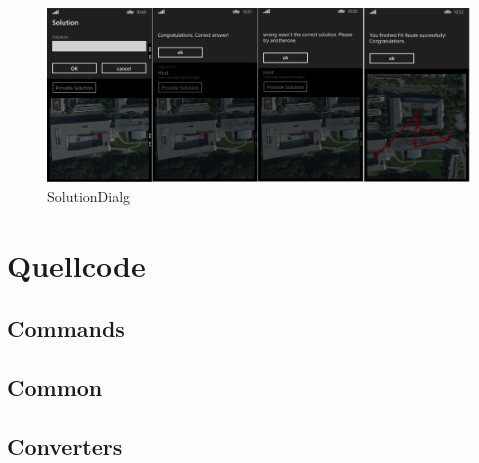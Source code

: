 \documentclass[a4paper,ngerman]{scrartcl}
\begin{document}
\begin{figure}[h]
	\centering
	\includegraphics[width=.95\textwidth]{images/routeSolutionPage_Stati}
	\caption{SolutionDialg}
		\label{fig:ScreenSolution}
\end{figure}



\newpage
\section{Quellcode}

\subsection{Commands}


\subsection{Common}






\subsection{Converters}


\end{document}
